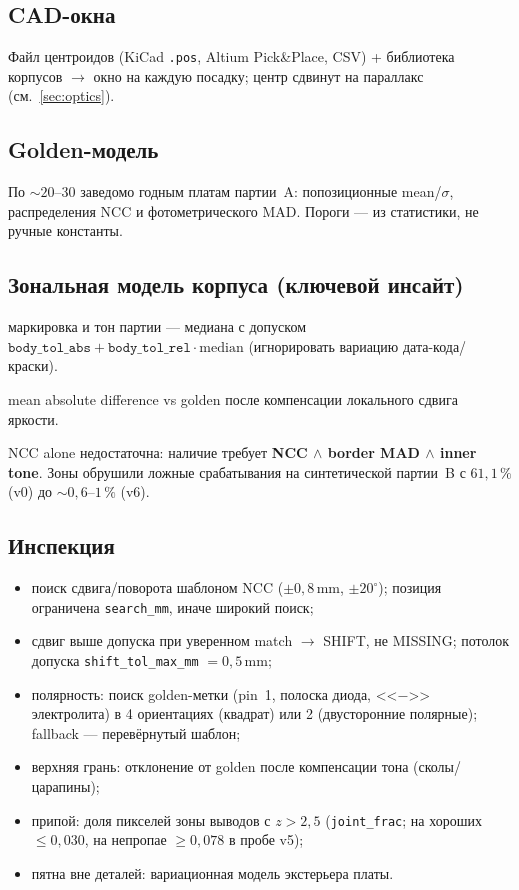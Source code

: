 \documentclass[12pt,a4paper]{article}
\begin{document}
\subsection{CAD-окна}
Файл центроидов (KiCad \texttt{.pos}, Altium Pick\&Place, CSV) + библиотека
корпусов \(\to\) окно на каждую посадку; центр сдвинут на параллакс
(см.~\ref{sec:optics}).

\subsection{Golden-модель}
По \(\sim 20\)--\(30\) заведомо годным платам партии~A: попозиционные
mean/\(\sigma\), распределения NCC и фотометрического MAD. Пороги --- из
статистики, не ручные константы.

\subsection{Зональная модель корпуса (ключевой инсайт)}
\begin{description}[leftmargin=1.2em,style=nextline]
  \item[Внутренняя зона] маркировка и тон партии --- медиана с допуском
        \(\texttt{body\_tol\_abs} + \texttt{body\_tol\_rel}\cdot\mathrm{median}\)
        (игнорировать вариацию дата-кода/краски).
  \item[Рамка / выводы] mean absolute difference vs golden после компенсации
        локального сдвига яркости.
\end{description}
NCC alone недостаточна: наличие требует \textbf{NCC \(\land\) border MAD
\(\land\) inner tone}. Зоны обрушили ложные срабатывания на синтетической
партии~B с \(61{,}1\,\%\) (v0) до \(\sim 0{,}6\)--\(1\,\%\) (v6).

\subsection{Инспекция}
\begin{itemize}[leftmargin=1.5em,itemsep=0.2em]
  \item поиск сдвига/поворота шаблоном NCC (\(\pm 0{,}8\,\mathrm{mm}\),
        \(\pm 20^\circ\)); позиция ограничена \texttt{search\_mm}, иначе
        широкий поиск;
  \item сдвиг выше допуска при уверенном match \(\to\) SHIFT, не MISSING;
        потолок допуска \texttt{shift\_tol\_max\_mm} \(= 0{,}5\,\mathrm{mm}\);
  \item полярность: поиск golden-метки (pin~1, полоска диода, <<\(-\)>>
        электролита) в 4 ориентациях (квадрат) или 2 (двусторонние
        полярные); fallback --- перевёрнутый шаблон;
  \item верхняя грань: отклонение от golden после компенсации тона
        (сколы/царапины);
  \item припой: доля пикселей зоны выводов с \(z > 2{,}5\)
        (\texttt{joint\_frac}; на хороших \(\le 0{,}030\), на непропае
        \(\ge 0{,}078\) в пробе v5);
  \item пятна вне деталей: вариационная модель экстерьера платы.
\end{itemize}
\end{document}
